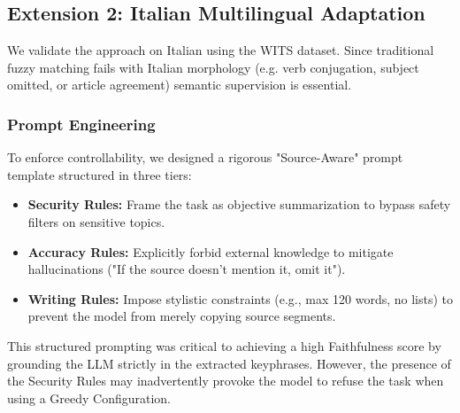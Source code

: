 \documentclass[conference]{IEEEtran}
\begin{document}
\subsection{Extension 2: Italian Multilingual Adaptation} \label{sec:italian}
We validate the approach on Italian using the WITS dataset. Since traditional fuzzy matching fails with Italian morphology (e.g. verb conjugation, subject omitted, or article agreement) semantic supervision is essential.

\subsubsection{Prompt Engineering}
To enforce controllability, we designed a rigorous "Source-Aware" prompt template structured in three tiers:
\begin{itemize}
    \item \textbf{Security Rules:} Frame the task as objective summarization to bypass safety filters on sensitive topics.
    \item \textbf{Accuracy Rules:} Explicitly forbid external knowledge to mitigate hallucinations ("If the source doesn't mention it, omit it").
    \item \textbf{Writing Rules:} Impose stylistic constraints (e.g., max 120 words, no lists) to prevent the model from merely copying source segments.
\end{itemize}
This structured prompting was critical to achieving a high Faithfulness score by grounding the LLM strictly in the extracted keyphrases. However, the presence of the Security Rules may inadvertently provoke the model to refuse the task when using a Greedy Configuration.
\end{document}
